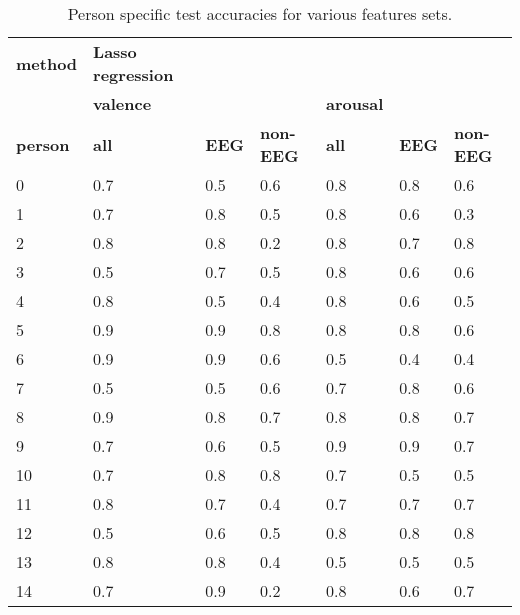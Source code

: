 \begin{table}[]
\centering
\caption{Person specific test accuracies for various features sets.}
\begin{tabular}{l|lll|lll}
\textbf{method}          & \textbf{Lasso regression}     &           &         &         &     &         \\
                & \textbf{valence}              &           &         & \textbf{arousal} &     &         \\
\textbf{person}          & \textbf{all}                  & \textbf{EEG}       & \textbf{non-EEG} & \textbf{all}     & \textbf{EEG} & \textbf{non-EEG} \\ \hline 
 0               & 0.7                  & 0.5       & 0.6     & 0.8     & 0.8 & 0.6     \\
1               & 0.7                  & 0.8       & 0.5     & 0.8     & 0.6 & 0.3     \\
2               & 0.8                  & 0.8       & 0.2     & 0.8     & 0.7 & 0.8     \\
3               & 0.5                  & 0.7       & 0.5     & 0.8     & 0.6 & 0.6     \\
4               & 0.8                  & 0.5       & 0.4     & 0.8     & 0.6 & 0.5     \\
5               & 0.9                  & 0.9       & 0.8     & 0.8     & 0.8 & 0.6     \\
6               & 0.9                  & 0.9       & 0.6     & 0.5     & 0.4 & 0.4     \\
7               & 0.5                  & 0.5       & 0.6     & 0.7     & 0.8 & 0.6     \\
8               & 0.9                  & 0.8       & 0.7     & 0.8     & 0.8 & 0.7     \\
9               & 0.7                  & 0.6       & 0.5     & 0.9     & 0.9 & 0.7     \\
10              & 0.7                  & 0.8       & 0.8     & 0.7     & 0.5 & 0.5     \\
11              & 0.8                  & 0.7       & 0.4     & 0.7     & 0.7 & 0.7     \\
12              & 0.5                  & 0.6       & 0.5     & 0.8     & 0.8 & 0.8     \\
13              & 0.8                  & 0.8       & 0.4     & 0.5     & 0.5 & 0.5     \\
14              & 0.7                  & 0.9       & 0.2     & 0.8     & 0.6 & 0.7     \\

\end{tabular}
\end{table}
